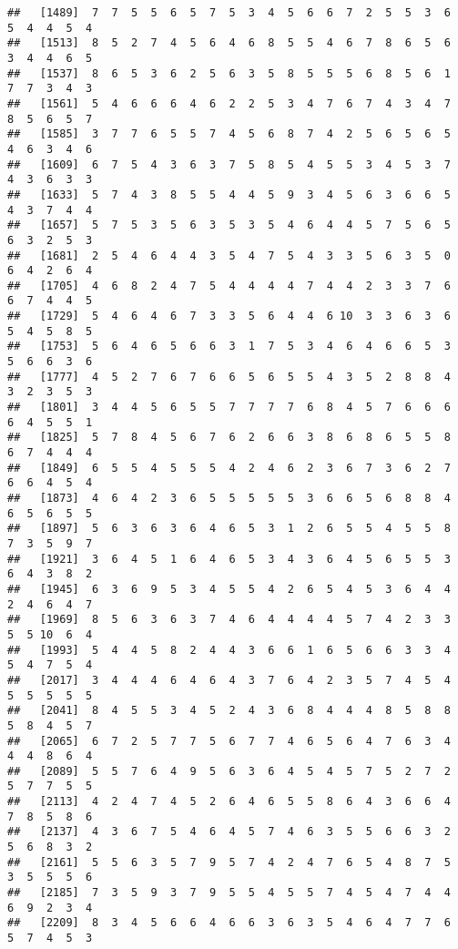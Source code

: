 \documentclass[
]{book}
\begin{document}
\begin{verbatim}
##   [1489]  7  7  5  5  6  5  7  5  3  4  5  6  6  7  2  5  5  3  6  5  4  4  5  4
##   [1513]  8  5  2  7  4  5  6  4  6  8  5  5  4  6  7  8  6  5  6  3  4  4  6  5
##   [1537]  8  6  5  3  6  2  5  6  3  5  8  5  5  5  6  8  5  6  1  7  7  3  4  3
##   [1561]  5  4  6  6  6  4  6  2  2  5  3  4  7  6  7  4  3  4  7  8  5  6  5  7
##   [1585]  3  7  7  6  5  5  7  4  5  6  8  7  4  2  5  6  5  6  5  4  6  3  4  6
##   [1609]  6  7  5  4  3  6  3  7  5  8  5  4  5  5  3  4  5  3  7  4  3  6  3  3
##   [1633]  5  7  4  3  8  5  5  4  4  5  9  3  4  5  6  3  6  6  5  4  3  7  4  4
##   [1657]  5  7  5  3  5  6  3  5  3  5  4  6  4  4  5  7  5  6  5  6  3  2  5  3
##   [1681]  2  5  4  6  4  4  3  5  4  7  5  4  3  3  5  6  3  5  0  6  4  2  6  4
##   [1705]  4  6  8  2  4  7  5  4  4  4  4  7  4  4  2  3  3  7  6  6  7  4  4  5
##   [1729]  5  4  6  4  6  7  3  3  5  6  4  4  6 10  3  3  6  3  6  5  4  5  8  5
##   [1753]  5  6  4  6  5  6  6  3  1  7  5  3  4  6  4  6  6  5  3  5  6  6  3  6
##   [1777]  4  5  2  7  6  7  6  6  5  6  5  5  4  3  5  2  8  8  4  3  2  3  5  3
##   [1801]  3  4  4  5  6  5  5  7  7  7  7  6  8  4  5  7  6  6  6  6  4  5  5  1
##   [1825]  5  7  8  4  5  6  7  6  2  6  6  3  8  6  8  6  5  5  8  6  7  4  4  4
##   [1849]  6  5  5  4  5  5  5  4  2  4  6  2  3  6  7  3  6  2  7  6  6  4  5  4
##   [1873]  4  6  4  2  3  6  5  5  5  5  5  3  6  6  5  6  8  8  4  6  5  6  5  5
##   [1897]  5  6  3  6  3  6  4  6  5  3  1  2  6  5  5  4  5  5  8  7  3  5  9  7
##   [1921]  3  6  4  5  1  6  4  6  5  3  4  3  6  4  5  6  5  5  3  6  4  3  8  2
##   [1945]  6  3  6  9  5  3  4  5  5  4  2  6  5  4  5  3  6  4  4  2  4  6  4  7
##   [1969]  8  5  6  3  6  3  7  4  6  4  4  4  4  5  7  4  2  3  3  5  5 10  6  4
##   [1993]  5  4  4  5  8  2  4  4  3  6  6  1  6  5  6  6  3  3  4  5  4  7  5  4
##   [2017]  3  4  4  4  6  4  6  4  3  7  6  4  2  3  5  7  4  5  4  5  5  5  5  5
##   [2041]  8  4  5  5  3  4  5  2  4  3  6  8  4  4  4  8  5  8  8  5  8  4  5  7
##   [2065]  6  7  2  5  7  7  5  6  7  7  4  6  5  6  4  7  6  3  4  4  4  8  6  4
##   [2089]  5  5  7  6  4  9  5  6  3  6  4  5  4  5  7  5  2  7  2  5  7  7  5  5
##   [2113]  4  2  4  7  4  5  2  6  4  6  5  5  8  6  4  3  6  6  4  7  8  5  8  6
##   [2137]  4  3  6  7  5  4  6  4  5  7  4  6  3  5  5  6  6  3  2  5  6  8  3  2
##   [2161]  5  5  6  3  5  7  9  5  7  4  2  4  7  6  5  4  8  7  5  3  5  5  5  6
##   [2185]  7  3  5  9  3  7  9  5  5  4  5  5  7  4  5  4  7  4  4  6  9  2  3  4
##   [2209]  8  3  4  5  6  6  4  6  6  3  6  3  5  4  6  4  7  7  6  5  7  4  5  3

\end{verbatim}
\end{document}
